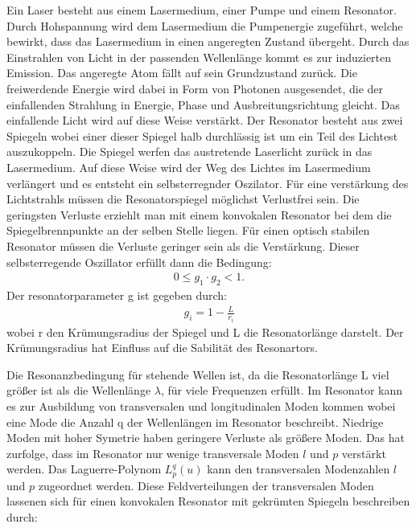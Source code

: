 Ein Laser besteht aus einem Lasermedium, einer Pumpe und einem Resonator.
Durch Hohspannung wird dem Lasermedium die Pumpenergie zugeführt, welche bewirkt, dass das Lasermedium in einen angeregten Zustand übergeht.
Durch das Einstrahlen von Licht in der passenden Wellenlänge kommt es zur induzierten Emission.
Das angeregte Atom fällt auf sein Grundzustand zurück.
Die freiwerdende Energie wird dabei in Form von Photonen ausgesendet, die der einfallenden Strahlung in Energie, Phase und Ausbreitungsrichtung gleicht.
Das einfallende Licht wird auf diese Weise verstärkt.
Der Resonator besteht aus zwei Spiegeln wobei einer dieser Spiegel halb durchlässig ist um ein Teil des Lichtest auszukoppeln.
Die Spiegel werfen das austretende Laserlicht zurück in das Lasermedium.
Auf diese Weise wird der Weg des Lichtes im Lasermedium verlängert und es entsteht ein selbsterregnder Oszilator.
Für eine verstärkung des Lichtstrahls müssen die Resonatorspiegel möglichst Verlustfrei sein.
Die geringsten Verluste erziehlt man mit einem konvokalen Resonator bei dem die Spiegelbrennpunkte an der selben Stelle liegen.
Für einen optisch stabilen Resonator müssen die Verluste geringer sein als die Verstärkung.
Dieser selbsterregende Oszillator erfüllt dann die Bedingung:
\begin{align*}
  0\leq g_1\cdot g_2 <1.
\end{align*}
Der resonatorparameter g ist gegeben durch:
\begin{align*}
  g_i=1-\frac{L}{r_i}
\end{align*}
wobei r den Krümungsradius der Spiegel und L die Resonatorlänge darstelt.
Der Krümungsradius hat Einfluss auf die Sabilität des Resonartors.

Die Resonanzbedingung für stehende Wellen ist, da die Resonatorlänge L viel größer ist als die Wellenlänge $\lambda$, für viele Frequenzen erfüllt.
Im Resonator kann es zur Ausbildung von transversalen und longitudinalen Moden kommen wobei eine Mode die Anzahl q der Wellenlängen im Resonator beschreibt.
Niedrige Moden mit hoher Symetrie haben geringere Verluste als größere Moden.
Das hat zurfolge, dass im Resonator nur wenige transversale Moden $l$ und $p$ verstärkt werden.
Das Laguerre-Polynom $L_p^q(u)$ kann den transversalen Modenzahlen $l$ und $p$ zugeordnet werden.
Diese Feldverteilungen der transversalen Moden lassenen sich für einen konvokalen Resonator mit gekrümten Spiegeln beschreiben durch:

